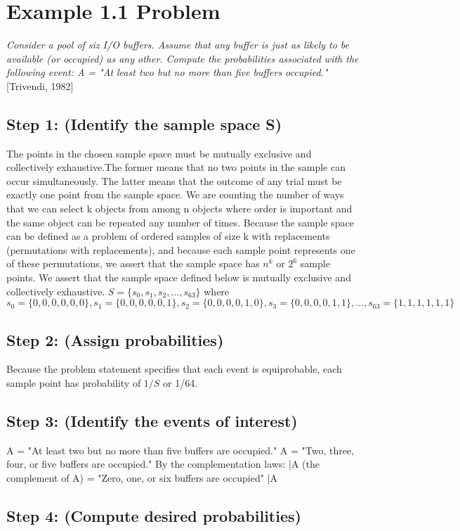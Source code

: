 \documentclass[a4paper,10pt]{article}
\title{}
\author{Mark Johnson \\
Loyola University Chicago}
\date {mjohnson4@luc.edu}
\begin{document}
\maketitle
\section{Example 1.1 Problem}
\emph{Consider a pool of siz I/O buffers. Assume that any buffer is just as likely to be available (or occupied) as 
any other. Compute the probabilities associated with the following event: \newline
A = "At least two but no more than five buffers occupied."} [Trivendi, 1982]
\subsection{Step 1: (Identify the sample space S)}
The points in the chosen sample space must be mutually exclusive and collectively exhaustive.The former means that no 
two points in the sample can occur simultaneously. The latter means that the outcome of any trial must be exactly one 
point from the sample space. We are counting the number of ways that we can select k objects from among n objects 
where order is important and the same object can be repeated any number of times. Because the sample space can be 
defined as a problem of ordered samples of size k with replacements (permutations with replacements), and because 
each sample point represents one of these permutations, we assert that the sample space has $ n^{k} $ or $ 2^{6} $ 
sample points. We assert that the sample space defined below is mutually exclusive and collectively exhaustive. 
\newline
$ S = \{s_{0}, s_{1}, s_{2},..., s_{63}\} $ where \newline
$ s_{0} = \{0,0,0,0,0,0\}, s_{1} = \{0,0,0,0,0,1\}, s_{2} = \{0,0,0,0,1,0\}, s_{3} = \{0,0,0,0,1,1\},..., s_{63} = 
\{1,1,1,1,1,1\} $
\subsection{Step 2: (Assign probabilities)}
Because the problem statement specifies that each event is equiprobable, each sample point has probability of $ 1/S $ 
or 1/64.
\subsection{Step 3: (Identify the events of interest)}
A = "At least two but no more than five buffers are occupied."
A = "Two, three, four, or five buffers are occupied."
By the complementation laws: \newline
\bar{A} (the complement of A) = "Zero, one, or six buffers are occupied"
\bar{A} 
\subsection{Step 4: (Compute desired probabilities)}
\end{document}
